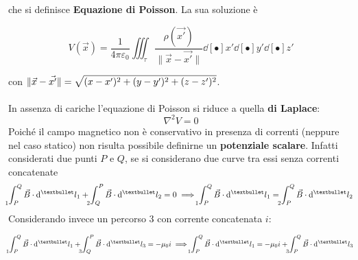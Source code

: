 che si definisce \textbf{Equazione di Poisson}. La sua soluzione è 

\[V(\vec{x}) = \frac{1}{4 \pi \varepsilon_0} \iiint_\tau \frac{\rho(\vec{x'})}{\| \vec{x} - \vec{x'} \|} \dd[•]{x'} \dd[•]{y'} \dd[•]{z'}\]

con $\displaystyle \| \vec{x} - \vec{x'} \| = \sqrt{(x - x')^2 + (y - y')^2 + (z - z')^2}$.
\\~\\In assenza di cariche l'equazione di Poisson si riduce a quella \textbf{di Laplace}:
\[\nabla^2 V = 0\]
Poiché il campo magnetico non è conservativo in presenza di correnti (neppure nel caso statico) non risulta possibile definirne un \textbf{potenziale scalare}. Infatti considerati due punti $P$ e $Q$, se si considerano due curve tra essi senza correnti concatenate
\[\int_{\hspace{-0.35cm} 1 \hspace{0.22cm} P}^Q \vec{B} \cdot \dd[•]{l_1} + \int_{\hspace{-0.35cm} 2 \hspace{0.22cm} Q}^P \vec{B} \cdot \dd[•]{l_2} = 0 \implies \int_{\hspace{-0.35cm} 1 \hspace{0.22cm} P}^Q \vec{B} \cdot \dd[•]{l_1} = \int_{\hspace{-0.35cm} 2 \hspace{0.22cm} P}^Q \vec{B} \cdot \dd[•]{l_2} \]
Considerando invece un percorso $3$ con corrente concatenata $i$:

\[\int_{\hspace{-0.35cm} 1 \hspace{0.22cm} P}^Q \vec{B} \cdot \dd[•]{l_1} + \int_{\hspace{-0.35cm} 3 \hspace{0.22cm} Q}^P \vec{B} \cdot \dd[•]{l_3} = - \mu_0 i \implies \int_{\hspace{-0.35cm} 1 \hspace{0.22cm} P}^Q \vec{B} \cdot \dd[•]{l_1} = - \mu_0 i + \int_{\hspace{-0.35cm} 3 \hspace{0.22cm} P}^Q \vec{B} \cdot \dd[•]{l_3}\]

